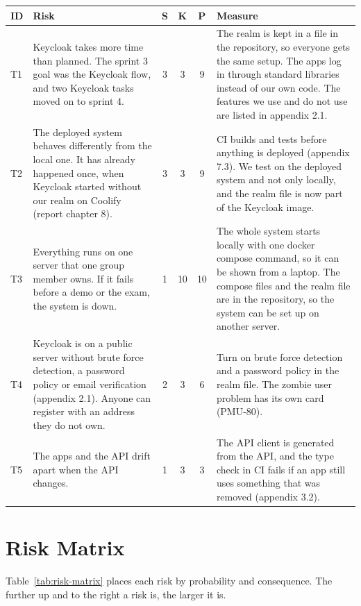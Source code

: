 \documentclass[a4paper,11pt]{article}
\begin{document}
\begin{center}
\begin{tabular}{@{}l >{\raggedright\arraybackslash}p{5.2cm} c c c >{\raggedright\arraybackslash}p{6.2cm}@{}}
\textbf{ID} & \textbf{Risk} & \textbf{S} & \textbf{K} & \textbf{P} & \textbf{Measure} \\
\hline
T1 & Keycloak takes more time than planned. The sprint 3 goal was the Keycloak flow, and two Keycloak tasks moved on to sprint 4. & 3 & 3 & 9 & The realm is kept in a file in the repository, so everyone gets the same setup. The apps log in through standard libraries instead of our own code. The features we use and do not use are listed in appendix 2.1. \\
\hline
T2 & The deployed system behaves differently from the local one. It has already happened once, when Keycloak started without our realm on Coolify (report chapter 8). & 3 & 3 & 9 & CI builds and tests before anything is deployed (appendix 7.3). We test on the deployed system and not only locally, and the realm file is now part of the Keycloak image. \\
\hline
T3 & Everything runs on one server that one group member owns. If it fails before a demo or the exam, the system is down. & 1 & 10 & 10 & The whole system starts locally with one docker compose command, so it can be shown from a laptop. The compose files and the realm file are in the repository, so the system can be set up on another server. \\
\hline
T4 & Keycloak is on a public server without brute force detection, a password policy or email verification (appendix 2.1). Anyone can register with an address they do not own. & 2 & 3 & 6 & Turn on brute force detection and a password policy in the realm file. The zombie user problem has its own card (PMU-80). \\
\hline
T5 & The apps and the API drift apart when the API changes. & 1 & 3 & 3 & The API client is generated from the API, and the type check in CI fails if an app still uses something that was removed (appendix 3.2). \\
\hline
\end{tabular}
\end{center}

\section{Risk Matrix}
Table~\ref{tab:risk-matrix} places each risk by probability and consequence. The further up and to the right a risk is, the larger it is.
\end{document}
